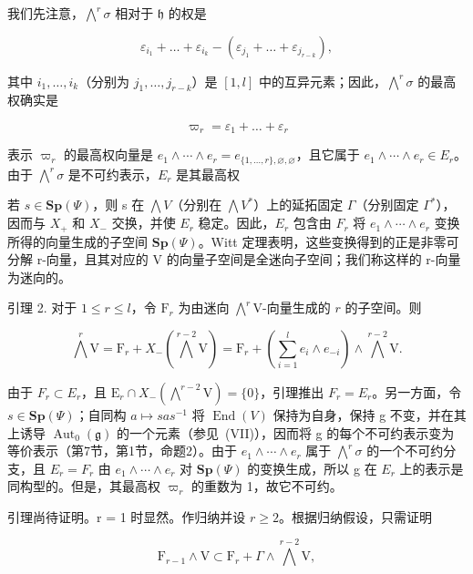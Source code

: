 我们先注意，\(\bigwedge^{r}\sigma\) 相对于 \(\mathfrak{h}\) 的权是

\[
\varepsilon_ {i _ {1}} + \dots + \varepsilon_ {i _ {k}} - (\varepsilon_ {j _ {1}} + \dots + \varepsilon_ {j _ {r - k}}),
\]

其中 \(i_1, \ldots, i_k\)（分别为 \(j_1, \ldots, j_{r-k}\)）是 \([1, l]\) 中的互异元素；因此，\(\bigwedge^r \sigma\) 的最高权确实是

\[
\varpi_ {r} = \varepsilon_ {1} + \dots + \varepsilon_ {r}
\]

表示 \(\varpi_{r}\) 的最高权向量是 \(e_{1} \wedge \cdots \wedge e_{r} = e_{\{1,\ldots,r\},\varnothing,\varnothing}\)，且它属于 \(e_{1} \wedge \cdots \wedge e_{r} \in E_{r}\)。由于 \(\bigwedge^{r}\sigma\) 是不可约表示，\(E_{r}\) 是其最高权

若 \(s \in \mathbf{Sp}(\varPsi)\)，则 s 在 \(\bigwedge V\)（分别在 \(\bigwedge V^{*}\)）上的延拓固定 \(\varGamma\)（分别固定 \(\varGamma^{*}\)），因而与 \(X_{+}\) 和 \(X_{-}\) 交换，并使 \(E_{r}\) 稳定。因此，\(E_{r}\) 包含由 \(F_{r}\) 将 \(e_{1} \wedge \cdots \wedge e_{r}\) 变换所得的向量生成的子空间 \(\mathbf{Sp}(\varPsi)\)。Witt 定理表明，这些变换得到的正是非零可分解 r-向量，且其对应的 V 的向量子空间是全迷向子空间；我们称这样的 r-向量为迷向的。

引理 2. 对于 \(1 \leq r \leq l\)，令 \(\mathrm{F}_r\) 为由迷向 \(\bigwedge^r\mathrm{V}\)-向量生成的 \(r\) 的子空间。则

\[
\bigwedge^ {r} \mathrm{V} = \mathrm{F} _ {r} + X _ {-} (\bigwedge^ {r - 2} \mathrm{V}) = \mathrm{F} _ {r} + \left(\sum_ {i = 1} ^ {l} e _ {i} \wedge e _ {- i}\right) \wedge \bigwedge^ {r - 2} \mathrm{V}.
\]

由于 \(F_{r} \subset E_{r}\)，且 \(\mathrm{E}_{r} \cap X_{-}(\bigwedge^{r-2}\mathrm{V}) = \{0\}\)，引理推出 \(F_{r} = E_{r}\)。另一方面，令 \(s \in \mathbf{Sp}(\varPsi)\)；自同构 \(a \mapsto sas^{-1}\) 将 \(\operatorname{End}(V)\) 保持为自身，保持 g 不变，并在其上诱导 \(\operatorname{Aut}_{0}(\mathfrak{g})\) 的一个元素（参见~(VII)），因而将 g 的每个不可约表示变为等价表示（第7节，第1节，命题2）。由于 \(e_{1} \wedge \cdots \wedge e_{r}\) 属于 \(\bigwedge^{r}\sigma\) 的一个不可约分支，且 \(E_{r} = F_{r}\) 由 \(e_{1} \wedge \cdots \wedge e_{r}\) 对 \(\mathbf{Sp}(\varPsi)\) 的变换生成，所以 g 在 \(E_{r}\) 上的表示是同构型的。但是，其最高权 \(\varpi_{r}\) 的重数为 1，故它不可约。

引理尚待证明。r = 1 时显然。作归纳并设 \(r \geq 2\)。根据归纳假设，只需证明

\[
\mathrm{F} _ {r - 1} \wedge \mathrm{V} \subset \mathrm{F} _ {r} + \Gamma \wedge \bigwedge^ {r - 2} \mathrm{V},
\]

